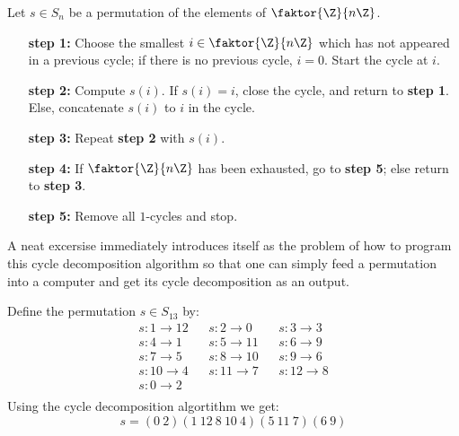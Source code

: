 \begin{algorithm}
    Let $s \in S_n$ be a permutation of the elements of  $\faktor{\Z}{n\Z}$.
    \begin{enumerate}
        \item[\textbf{step 1:}] Choose the smallest $i \in \faktor{\Z}{n\Z}$
            which has not appeared in a previous cycle; if there is no previous
            cycle, $i=0$. Start the cycle at $i$.

        \item[\textbf{step 2:}] Compute $s(i)$. If $s(i)=i$, close the cycle,
            and return to \textbf{step 1}. Else, concatenate $s(i)$ to $i$ in
            the cycle.

        \item[\textbf{step 3:}] Repeat  \textbf{step 2} with $s(i)$.

        \item[\textbf{step 4:}] If $\faktor{\Z}{n\Z}$ has been exhausted, go to
            \textbf{step 5}; else return to \textbf{step 3}.

        \item[\textbf{step 5:}] Remove all $1$-cycles and stop.
    \end{enumerate}
\end{algorithm}
\begin{remark}
A neat excersise immediately introduces itself as the problem of how to program
this cycle decomposition algorithm so that one can simply feed a permutation
into a computer and get its cycle decomposition as an output.
\end{remark}

\begin{example}
    Define the permutation $s \in S_{13}$ by:
    \begin{align*}
        s:1 \rightarrow 12 && s:2 \rightarrow 0 && s: 3 \rightarrow 3 \\
        s:4 \rightarrow 1 && s:5 \rightarrow 11 && s:6 \rightarrow 9 \\
        s:7 \rightarrow 5 && s:8 \rightarrow 10 && s:9 \rightarrow 6 \\
        s: 10 \rightarrow 4 && s:11 \rightarrow 7 && s:12 \rightarrow 8 \\
        s:0 \rightarrow 2 \\
    \end{align*}
    Using the cycle decomposition algortithm we get:
    \begin{equation*}
        s=(0 \ 2)(1 \ 12 \ 8 \ 10 \ 4)(5 \ 11 \ 7)(6 \ 9)
    \end{equation*}
\end{example}


